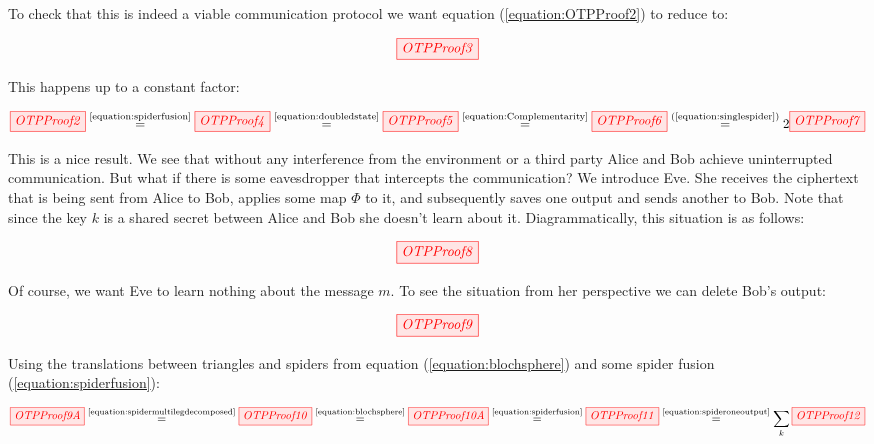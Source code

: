 \documentclass[]{article}
\newcommand{\equaltext}[1]{\ensuremath{\stackrel{\text{#1}}{=}}}
\begin{document}
To check that this is indeed a viable communication protocol we want equation (\ref{equation:OTPProof2}) to reduce to:

\begin{equation}
\label{equation:OTPProof3}
\tikzfig{OTPProof3}
\end{equation}

This happens up to a constant factor:

\begin{equation}
\label{equation:OTPProoflong}
\tikzfig{OTPProof2}\equaltext{\ref{equation:spiderfusion}} \tikzfig{OTPProof4} \equaltext{\ref{equation:doubledstate}} \tikzfig{OTPProof5} \equaltext{\ref{equation:Complementarity}} \tikzfig{OTPProof6} \equaltext{(\ref{equation:singlespider})} 2 \tikzfig{OTPProof7}
\end{equation}

This is a nice result. We see that without any interference from the environment or a third party Alice and Bob achieve uninterrupted communication. But what if there is some eavesdropper that intercepts the communication? We introduce Eve. She receives the ciphertext that is being sent from Alice to Bob, applies some map $\Phi$ to it, and subsequently saves one output and sends another to Bob. Note that since the key $k$ is a shared secret between Alice and Bob she doesn't learn about it. Diagrammatically, this situation is as follows:

\begin{equation}
	\tikzfig{OTPProof8}
\end{equation}

Of course, we want Eve to learn nothing about the message $m$. To see the situation from her perspective we can delete Bob's output:

\begin{equation}
	\tikzfig{OTPProof9}
\end{equation}

Using the translations between triangles and spiders from equation (\ref{equation:blochsphere}) and some spider fusion (\ref{equation:spiderfusion}):

\begin{equation}
\tikzfig{OTPProof9A} \equaltext{\ref{equation:spidermultilegdecomposed}} \tikzfig{OTPProof10} \equaltext{\ref{equation:blochsphere}} \tikzfig{OTPProof10A} \equaltext{\ref{equation:spiderfusion}} \tikzfig{OTPProof11} \equaltext{\ref{equation:spideroneoutput}} \sum\limits_{k} \tikzfig{OTPProof12}
\end{equation}
\end{document}
